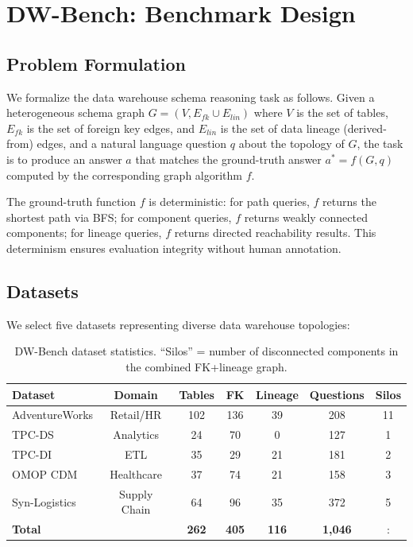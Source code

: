 \section{DW-Bench: Benchmark Design}
\label{sec:benchmark}

\subsection{Problem Formulation}

We formalize the data warehouse schema reasoning task as follows.
Given a heterogeneous schema graph $G = (V, E_{fk} \cup E_{lin})$
where $V$ is the set of tables, $E_{fk}$ is the set of foreign key
edges, and $E_{lin}$ is the set of data lineage (derived-from) edges,
and a natural language question $q$ about the topology of $G$, the
task is to produce an answer $a$ that matches the ground-truth answer
$a^* = f(G, q)$ computed by the corresponding graph algorithm $f$.

The ground-truth function $f$ is deterministic: for path queries,
$f$ returns the shortest path via BFS; for component queries, $f$
returns weakly connected components; for lineage queries, $f$ returns
directed reachability results.  This determinism ensures evaluation
integrity without human annotation.

\subsection{Datasets}

We select five datasets representing diverse data warehouse topologies:

\begin{table}[t]
\centering
\caption{DW-Bench dataset statistics. ``Silos'' = number of disconnected
components in the combined FK+lineage graph.}
\label{tab:datasets}
\begin{tabular}{lcccccc}
\toprule
Dataset & Domain & Tables & FK & Lineage & Questions & Silos \\
\midrule
AdventureWorks & Retail/HR    & 102 & 136 & 39 & 208 & 11 \\
TPC-DS         & Analytics    &  24 &  70 &  0 & 127 &  1 \\
TPC-DI         & ETL          &  35 &  29 & 21 & 181 &  2 \\
OMOP CDM       & Healthcare   &  37 &  74 & 21 & 158 &  3 \\
Syn-Logistics  & Supply Chain &  64 &  96 & 35 & 372 &  5 \\
\midrule
\textbf{Total} &              & \textbf{262} & \textbf{405} & \textbf{116} & \textbf{1,046} &: \\
\bottomrule
\end{tabular}
\end{table}


